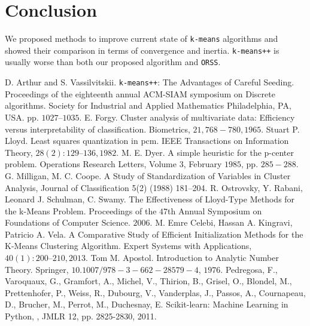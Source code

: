 \documentclass[twoside, 11pt]{article}
\begin{document}
	\section{Conclusion}
	We proposed methods to improve current state of \texttt{k-means} algorithms and showed their comparison in terms of convergence and inertia. \texttt{k-means++} is usually worse than both our proposed algorithm and \texttt{ORSS}. 
	\begin{thebibliography}{99}
		 D. Arthur and S. Vassilvitskii. \texttt{k-means++}: The Advantages of Careful Seeding. Proceedings of the eighteenth annual ACM-SIAM symposium on Discrete algorithms. Society for Industrial and Applied Mathematics Philadelphia, PA, USA. pp. $1027–1035$.
		 E. Forgy. Cluster analysis of multivariate data: Efficiency versus interpretability of classification. Biometrics, $21, 768-780, 1965$.
		 Stuart P. Lloyd. Least squares quantization in pcm. IEEE Transactions on Information Theory, $28(2):129–136, 1982$.
		 M. E. Dyer. A simple heuristic for the p-center problem. Operations Research Letters, Volume $3$, February $1985$, pp. $285-288$.
		 G. Milligan, M. C. Coope. A Study of Standardization of Variables in Cluster Analysis, Journal of Classification 5(2) (1988) 181–204.
		 R. Ostrovsky, Y. Rabani, Leonard J. Schulman, C. Swamy. The Effectiveness of Lloyd-Type Methods for the k-Means Problem. Proceedings of the $47$th Annual Symposium on Foundations of Computer Science. $2006$.
		 M. Emre Celebi, Hassan A. Kingravi, Patricio A. Vela. A Comparative Study of Efficient Initialization Methods for the K-Means Clustering Algorithm. Expert Systems with Applications, $40(1): 200–210, 2013$.
		 Tom M. Apostol. Introduction to Analytic Number Theory. Springer, $10.1007/978-3-662-28579-4$, $1976$.
		 Pedregosa, F., Varoquaux, G., Gramfort, A., Michel, V., Thirion, B., Grisel, O., Blondel, M., Prettenhofer, P., Weiss, R., Dubourg, V., Vanderplas, J., Passos, A., Cournapeau, D., Brucher, M., Perrot, M., Duchesnay, E. Scikit-learn: Machine Learning in Python, , JMLR 12, pp. 2825-2830, 2011.
	\end{thebibliography}
\end{document}
